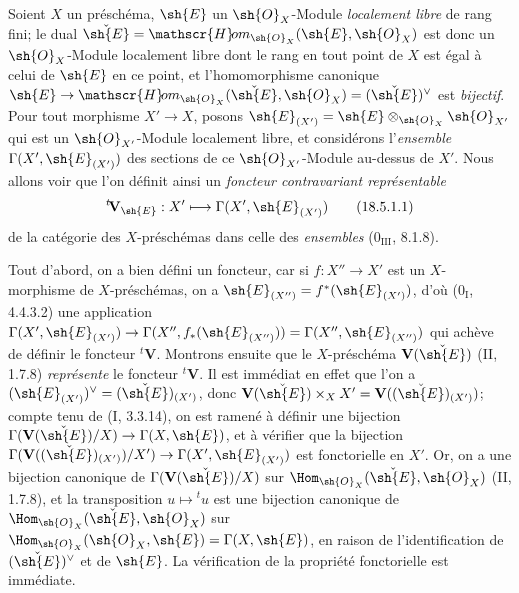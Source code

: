 \begingroup
\newcommand{\shHom}{\mathscr{H}\!om}
\begin{env}[18.5.1]
\label{IV.18.5.1}
Soient $X$ un préschéma, $\sh{E}$ un $\sh{O}_X$-Module \emph{localement libre} de rang fini; le dual $\check{\sh{E}}=\shHom_{\sh{O}_X}(\sh{E},\sh{O}_X)$ est donc un $\sh{O}_X$-Module localement libre dont le rang en tout point de $X$ est égal à celui de $\sh{E}$ en ce point, et l'homomorphisme canonique $\sh{E}\to\shHom_{\sh{O}_X}(\check{\sh{E}},\sh{O}_X)=(\check{\sh{E}})^\vee$ est \emph{bijectif}. Pour tout morphisme $X'\to X$, posons $\sh{E}_{(X')}=\sh{E}\otimes_{\sh{O}_X}\sh{O}_{X'}$ qui est un $\sh{O}_{X'}$-Module localement libre, et considérons l'\emph{ensemble} $\Gamma(X',\sh{E}_{(X')})$ des sections de ce $\sh{O}_{X'}$-Module au-dessus de $X'$. Nous allons voir que l'on définit ainsi un \emph{foncteur contravariant représentable}
\begin{equation}
  {}^t\!\mathbf V_{\sh{E}}:X'\longmapsto\Gamma(X',\sh{E}_{(X')})
  \tag{18.5.1.1}\label{IV.18.5.1.1}
\end{equation}
de la catégorie des $X$-préschémas dans celle des \emph{ensembles} ($0_{\mathrm{III}}$, 8.1.8).

Tout d'abord, on a bien défini un foncteur, car si $f:X''\to X'$ est un $X$-morphisme de $X$-préschémas, on a $\sh{E}_{(X'')}=f^*(\sh{E}_{(X')})$, d'où ($0_{\mathrm I}$, 4.4.3.2) une application $\Gamma(X',\sh{E}_{(X')})\to\Gamma(X'',f_*(\sh{E}_{(X'')}))=\Gamma(X'',\sh{E}_{(X'')})$ qui achève de définir le foncteur ${}^t\!\mathbf V$. Montrons ensuite que le $X$-préschéma $\mathbf V(\check{\sh{E}})$ (II, 1.7.8) \emph{représente} le foncteur ${}^t\!\mathbf V$. Il est immédiat en effet que l'on a $(\sh{E}_{(X')})^\vee=(\check{\sh{E}})_{(X')}$, donc $\mathbf V(\check{\sh{E}})\times_X X'=\mathbf V((\check{\sh{E}})_{(X')})$; compte tenu de (I, 3.3.14), on est ramené à définir une bijection $\Gamma(\mathbf V(\check{\sh{E}})/X)\to\Gamma(X,\sh{E})$, et à vérifier que la bijection $\Gamma(\mathbf V((\check{\sh{E}})_{(X')})/X')\to\Gamma(X',\sh{E}_{(X')})$ est fonctorielle en $X'$. Or, on a une bijection canonique de $\Gamma(\mathbf V(\check{\sh{E}})/X)$ sur $\Hom_{\sh{O}_X}(\check{\sh{E}},\sh{O}_X)$ (II, 1.7.8), et la transposition $u\mapsto{}^t u$ est une bijection canonique de $\Hom_{\sh{O}_X}(\check{\sh{E}},\sh{O}_X)$ sur $\Hom_{\sh{O}_X}(\sh{O}_X,\sh{E})=\Gamma(X,\sh{E})$, en raison de l'identification de $(\check{\sh{E}})^\vee$ et de $\sh{E}$. La vérification de la propriété fonctorielle est immédiate.
\end{env}
\endgroup

